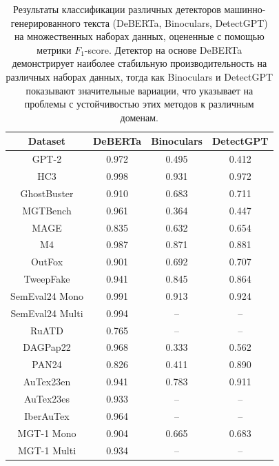 \begin{table}[h!t]\centering
    \begin{tabular}{c|c|c|c}
    \toprule
        Dataset & DeBERTa & Binoculars & DetectGPT \\
    \midrule
        GPT-2 &  0.972 & 0.495 & 0.412\\
        HC3 & 0.998 &  0.931 & 0.972 \\
        GhostBuster & 0.910 &   0.683  &  0.711 \\
        MGTBench & 0.961 & 0.364 & 0.447 \\
        MAGE &  0.835 &  0.632 &  0.654 \\
        M4 & 0.987 &  0.871 &  0.881   \\
        OutFox & 0.901 & 0.692 & 0.707 \\
        TweepFake & 0.941 & 0.845 & 0.864 \\
    \midrule
        SemEval24 Mono & 0.991 & 0.913 & 0.924 \\
        SemEval24 Multi & 0.994 & -- & --\\
        RuATD & 0.765 & -- & -- \\
        DAGPap22 &  0.968 & 0.333 & 0.562 \\
        PAN24  & 0.826 &  0.411 & 0.890 \\
        AuTex23en & 0.941 & 0.783 & 0.911\\
        AuTex23es & 0.933 & -- & --\\
        IberAuTex & 0.964 & -- & --\\
        MGT-1 Mono & 0.904 & 0.665 & 0.683 \\
        MGT-1 Multi & 0.934 & -- & --\\
    \bottomrule
    \end{tabular}
    \caption{Результаты классификации различных детекторов машинно-генерированного текста (DeBERTa, Binoculars, DetectGPT) на множественных наборах данных, оцененные с помощью метрики $F_1$-score. Детектор на основе DeBERTa демонстрирует наиболее стабильную производительность на различных наборах данных, тогда как Binoculars и DetectGPT показывают значительные вариации, что указывает на проблемы с устойчивостью этих методов к различным доменам.}
    \label{tab:classifier}
\end{table}

